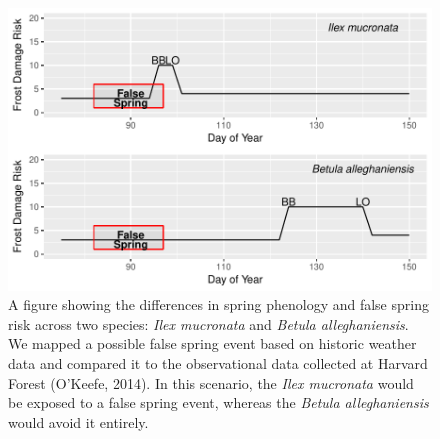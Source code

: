 \documentclass{article}\usepackage[]{graphicx}\usepackage[]{color}
\makeatletter
\def\maxwidth{ %
  \ifdim\Gin@nat@width>\linewidth
    \linewidth
  \else
    \Gin@nat@width
  \fi
}
\makeatother
\begin{document}
\begin{figure}[H]

{\centering \includegraphics[width=\maxwidth]{figure/risk-1} 

}

\caption{A figure showing the differences in spring phenology and false spring risk across two species: \textit{Ilex mucronata} and \textit{Betula alleghaniensis}. We mapped a possible false spring event based on historic weather data and compared it to the observational data collected at Harvard Forest (O'Keefe, 2014). In this scenario, the \textit{Ilex mucronata} would be exposed to a false spring event, whereas the \textit{Betula alleghaniensis} would avoid it entirely.}\label{fig:risk}
\end{figure}
\end{document}
